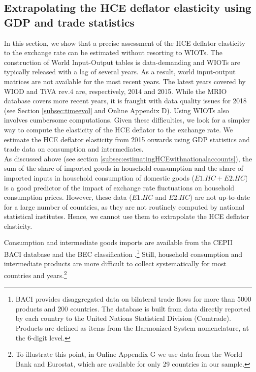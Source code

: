 \documentclass[11pt,a4paper]{paper} %
\begin{document}
\subsection{Extrapolating the HCE deflator elasticity using GDP and trade statistics}\label{sec:Extrapolations}
In this section, we show that a precise assessment of the HCE deflator elasticity to the exchange rate can be estimated without resorting to WIOTs. 
The construction of World Input-Output tables is data-demanding and WIOTs are typically released with a lag of several years.
As a result, world input-output matrices are not available for the most recent years.
The latest years covered by WIOD and TiVA rev.4 are, respectively, 2014 and 2015. 
While the MRIO database covers more recent years, it is fraught with data quality issues for 2018 (see Section \ref{subsec:timeevol} and Online Appendix D).
Using WIOTs also involves cumbersome computations.
Given these difficulties, we look for a simpler way to compute the elasticity of the HCE deflator to the exchange rate.
We estimate the HCE deflator elasticity from 2015 onwards using GDP statistics and trade data on consumption and intermediates.\\
As discussed above (see section \ref{subsec:estimatingHCEwithnationalaccounts}), the sum of the share of imported goods in household consumption and the share of imported inputs in household consumption of domestic goods ($E1.HC + E2.HC$) is a good predictor of the impact of exchange rate fluctuations on household consumption prices. 
However, these data ($E1.HC$ and $E2.HC$) are not up-to-date for a large number of countries, as they are not routinely computed by national statistical institutes.
Hence, we cannot use them to extrapolate the HCE deflator elasticity.

Consumption and intermediate goods imports are available from the CEPII BACI database and the BEC classification \citep{Gaulier2010}.\footnote{BACI provides disaggregated data on bilateral trade flows for more than 5000 products and 200 countries. The database is built from data directly reported by each country to the United Nations Statistical Division (Comtrade). Products are defined as items from the Harmonized System nomenclature, at the 6-digit level.}
Still, household consumption and intermediate products are more difficult to collect systematically for most countries and years.\footnote{To illustrate this point, in Online Appendix G we use data from the World Bank and Eurostat, which are available for only 29 countries in our sample.}
\end{document}

